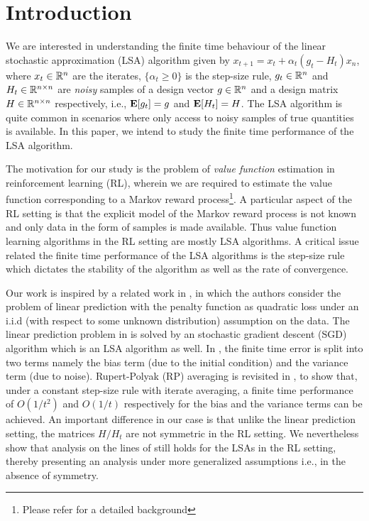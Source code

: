 \section{Introduction}
We are interested in understanding the finite time behaviour of the linear stochastic approximation (LSA) algorithm given by $x_{t+1}=x_t+\alpha_t(g_t-H_t)x_n$, where $x_t\in \mathbb{R}^n$ are the iterates, $\{\alpha_t\geq 0\}$ is the step-size rule, $g_t\in \mathbb{R}^n$ and $H_t\in \mathbb{R}^{n\times n}$ are \emph{noisy} samples of a design vector $g\in\mathbb{R}^n$ and a design matrix $H\in\mathbb{R}^{n\times n}$ respectively, i.e., $\mathbf{E}[g_t]=g$ and $\mathbf{E}[H_t]=H$. The LSA algorithm is quite common in scenarios where only access to noisy samples of true quantities is available. In this paper, we intend to study the finite time performance of the LSA algorithm.\par
The motivation for our study is the problem of \emph{value function} estimation in reinforcement learning (RL), wherein we are required to estimate the value function corresponding to a Markov reward process\footnote{Please refer \cite{BertB} for a detailed background}. A particular aspect of the RL setting is that the explicit model of the Markov reward process is not known and only data in the form of samples is made available. Thus value function learning algorithms in the RL setting are mostly LSA algorithms. A critical issue related the finite time performance of the LSA algorithms is the step-size rule which dictates the stability of the algorithm as well as the rate of convergence. 
\par
Our work is inspired by a related work in \cite{bachaistats}, in which the authors consider the problem of linear prediction with the penalty function as quadratic loss under an i.i.d  (with respect to some unknown distribution) assumption on the data. The linear prediction problem in \cite{bachaistats} is solved by an stochastic gradient descent (SGD) algorithm which is an LSA algorithm as well. In \cite{bachaistats}, the finite time error is split into two terms namely the bias term (due to the initial condition) and the variance term (due to noise). Rupert-Polyak (RP) averaging is revisited in \cite{bachaistats}, to show that, under a constant step-size rule with iterate averaging, a finite time performance of $O(1/t^2)$ and $O(1/t)$ respectively for the bias and the variance terms can be achieved. An important difference in our case is that unlike the linear prediction setting, the matrices $H/H_t$ are not symmetric in the RL setting. We nevertheless show that analysis on the lines of \cite{bachaistats} still holds for the LSAs in the RL setting, thereby presenting an analysis under more generalized assumptions i.e., in the absence of symmetry.\par
